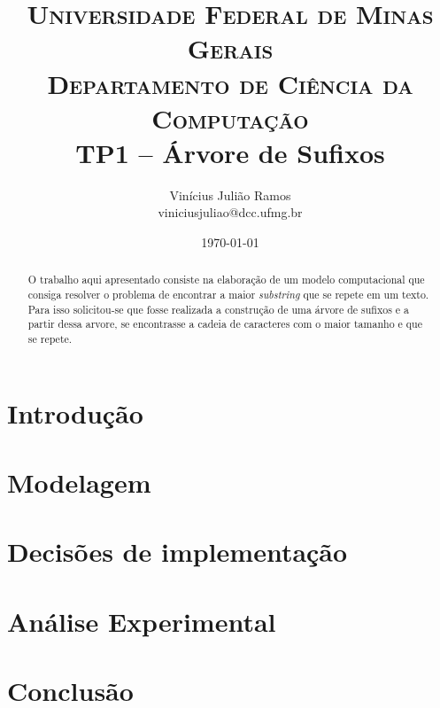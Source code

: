 \documentclass[10pt]{extarticle}
\title{ \textsc{Universidade Federal de Minas Gerais} \\ \textsc{Departamento de Ciência da Computação} \\ \bigskip TP1 -- Árvore de Sufixos}
\author{Vinícius Julião Ramos \\ \normalsize{viniciusjuliao@dcc.ufmg.br}}
\date{\today}
\begin{document}
\maketitle

\begin{abstract}
O trabalho aqui apresentado consiste na elaboração de um modelo computacional
que consiga resolver o problema de encontrar a maior \textit{substring} que
se repete em um texto.
Para isso solicitou-se que fosse realizada a construção de uma árvore de sufixos
e a partir dessa arvore, se encontrasse a cadeia de caracteres com o maior
tamanho e que se repete.
\end{abstract}
    
\section{Introdução}

\newpage

\section{Modelagem}


\section{Decisões de implementação}


\section{Análise Experimental}


\section{Conclusão}



    
    

    
    
    
    
\end{document}
